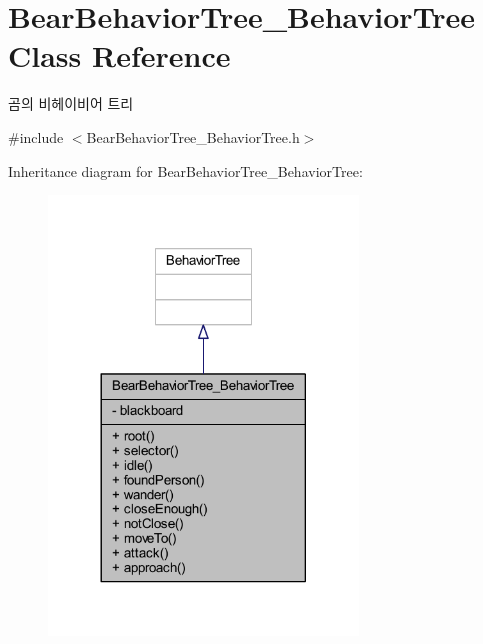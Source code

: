 \hypertarget{class_bear_behavior_tree___behavior_tree}{}\section{Bear\+Behavior\+Tree\+\_\+\+Behavior\+Tree Class Reference}
\label{class_bear_behavior_tree___behavior_tree}


곰의 비헤이비어 트리  




{\ttfamily \#include $<$Bear\+Behavior\+Tree\+\_\+\+Behavior\+Tree.\+h$>$}



Inheritance diagram for Bear\+Behavior\+Tree\+\_\+\+Behavior\+Tree\+:
\nopagebreak
\begin{figure}[H]
\begin{center}
\leavevmode
\includegraphics[width=233pt]{class_bear_behavior_tree___behavior_tree__inherit__graph}
\end{center}
\end{figure}


